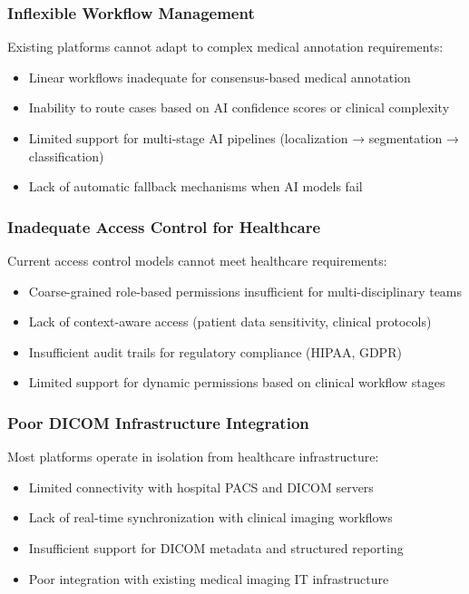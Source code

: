 \subsubsection{Inflexible Workflow Management}

Existing platforms cannot adapt to complex medical annotation requirements:

\begin{itemize}
    \item Linear workflows inadequate for consensus-based medical annotation
    \item Inability to route cases based on AI confidence scores or clinical complexity
    \item Limited support for multi-stage AI pipelines (localization → segmentation → classification)
    \item Lack of automatic fallback mechanisms when AI models fail
\end{itemize}

\subsubsection{Inadequate Access Control for Healthcare}

Current access control models cannot meet healthcare requirements:

\begin{itemize}
    \item Coarse-grained role-based permissions insufficient for multi-disciplinary teams
    \item Lack of context-aware access (patient data sensitivity, clinical protocols)
    \item Insufficient audit trails for regulatory compliance (HIPAA, GDPR)
    \item Limited support for dynamic permissions based on clinical workflow stages
\end{itemize}

\subsubsection{Poor DICOM Infrastructure Integration}

Most platforms operate in isolation from healthcare infrastructure:

\begin{itemize}
    \item Limited connectivity with hospital PACS and DICOM servers
    \item Lack of real-time synchronization with clinical imaging workflows
    \item Insufficient support for DICOM metadata and structured reporting
    \item Poor integration with existing medical imaging IT infrastructure
\end{itemize}

